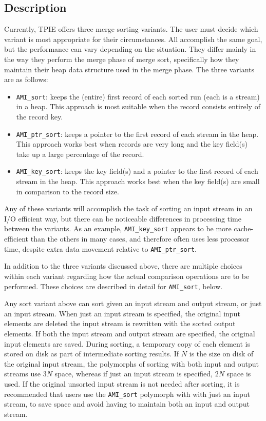 \etabb

\subsection{Description}
Currently, TPIE offers three
merge sorting variants. The user must decide which variant is most
appropriate for their circumstances.  All accomplish the same goal,
but the performance can vary depending on the situation. They differ
mainly in the way they perform the merge phase of merge sort,
specifically how they maintain their heap data structure used in the
merge phase. The three variants are as follows:
\begin{itemize}
\item \lstinline|AMI_sort|: keeps the (entire) first record of each
  sorted run (each is a stream) in a heap. This approach is most
  suitable when the record consists entirely of the record key.
    
\item \lstinline|AMI_ptr_sort|: keeps a pointer to the first record of
  each stream in the heap. This approach works best when records are
  very long and the key field(s) take up a large percentage of the
  record.
  
\item \lstinline|AMI_key_sort|: keeps the key field(s) and a pointer
  to the first record of each stream in the heap. This approach works
  best when the key field(s) are small in comparison to the record
  size.
\end{itemize}

Any of these variants will accomplish the task of sorting an input
stream in an I/O efficient way, but there can be noticeable
differences in processing time between the variants. As an example,
\lstinline|AMI_key_sort| appears to be more cache-efficient than the
others in many cases, and therefore often uses less processor time,
despite extra data movement relative to \lstinline|AMI_ptr_sort|.

In addition to the three variants discussed above, there are multiple
choices within each variant regarding how the actual comparison
operations are to be performed. These choices are described in detail
for \lstinline|AMI_sort|, below.
 
Any sort variant above can sort given an input stream and output stream,
or just an input stream. When just an input stream is specified, the
original input elements are deleted the input stream is rewritten with the
sorted output elements. If both the input stream and output stream are
specified, the original input elements are saved. During sorting, a
temporary copy of each element is stored on disk as part of intermediate
sorting results. If $N$ is the size on disk of the original input stream,
the polymorphs of sorting with both input and output streams use $3N$
space, whereas if just an input stream is specified, $2N$ space is used.
If the original unsorted input stream is not needed after sorting, it is
recommended that users use the \lstinline|AMI_sort| polymorph with with just
an input stream, to save space and avoid having to maintain both an input
and output stream. 

